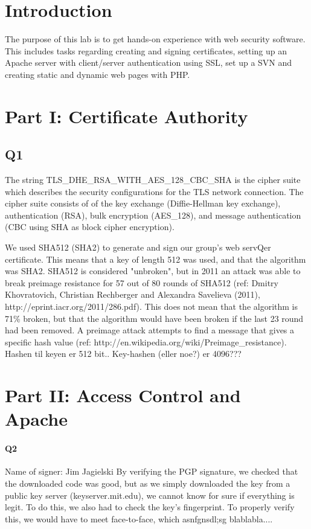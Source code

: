 \documentclass[11pt, a4paper]{article}
\begin{document}
\section{Introduction}
The purpose of this lab is to get hands-on experience with web security software. This includes tasks regarding creating and signing certificates, setting up an Apache server with client/server authentication using SSL, set up a SVN and creating static and dynamic web pages with PHP. 
\section{Part I: Certificate Authority}
\subsection{Q1} 
The string TLS\_DHE\_RSA\_WITH\_AES\_128\_CBC\_SHA is the cipher suite which describes the security configurations for the TLS network connection. The cipher suite consists of of the key exchange (Diffie-Hellman key exchange), authentication (RSA), bulk encryption (AES\_128), and message authentication (CBC using SHA as block cipher encryption). 

We used SHA512 (SHA2) to generate and sign our group's web servQer certificate. This means that a key of length 512 was used, and that the algorithm was SHA2. SHA512 is considered "unbroken", but in 2011 an attack was able to break preimage resistance  for 57 out of 80 rounds of SHA512 (ref: Dmitry Khovratovich, Christian Rechberger and Alexandra Savelieva (2011), http://eprint.iacr.org/2011/286.pdf). This does not mean that the algorithm is 71\% broken, but that the algorithm would have been broken if the last 23 round had been removed. A preimage attack attempts to find a message that gives a specific hash value (ref: http://en.wikipedia.org/wiki/Preimage\_resistance).
Hashen til keyen er 512 bit.. Key-hashen (eller noe?) er 4096???
\section{Part II: Access Control and Apache}
\paragraph{Q2}
Name of signer: Jim Jagielski
By verifying the PGP signature, we checked that the downloaded code was good, but as we simply downloaded the key from a public key server (keyserver.mit.edu), we cannot know for sure if everything is legit. To do this, we also had to check the key's fingerprint. To properly verify this, we would have to meet face-to-face, which asnfgnsdl;sg blablabla....
\end{document}

